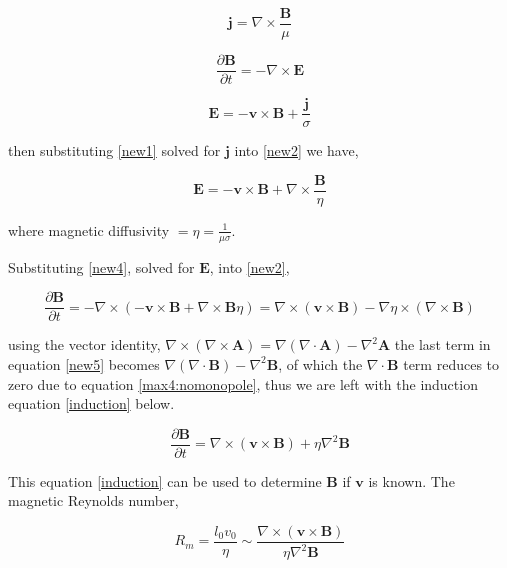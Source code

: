 \documentclass[11pt]{article}
\renewcommand{\vec}[1]{\mathbf{#1}}
\begin{document}
\begin{equation}\label{new1}
\vec{j}=\nabla\times\frac{\vec{B}}{\mu}
\end{equation}

\begin{equation}\label{new2}
\frac{\partial \vec{B}}{\partial t} = - \nabla\times\vec{E}
\end{equation}

\begin{equation}\label{new3}
\vec{E}=-\vec{v}\times\vec{B}+\frac{\vec{j}}{\sigma}
\end{equation}

then substituting \ref{new1} solved for $\vec{j}$ into \ref{new2} we have,

\begin{equation}\label{new4} 
\vec{E}=-\vec{v}\times\vec{B}+\nabla\times\frac{\vec{B}}{\eta} 
\end{equation}

where magnetic diffusivity $=\eta =\frac{1}{\mu\sigma}$.

Substituting \ref{new4}, solved for $\vec{E}$, into \ref{new2},

\begin{equation}\label{new5}
\frac{\partial \vec{B}}{\partial t}=-\nabla\times(-\vec{v}\times\vec{B} + \nabla\times\vec{B}\eta)
                                   =\nabla\times(\vec{v}\times\vec{B})-\nabla\eta\times(\nabla\times\vec{B})
\end{equation}

using the vector identity, $\nabla\times(\nabla\times\vec{A})=\nabla(\nabla\cdot\vec{A})-\nabla^{2}\vec{A}$ the last term in equation \ref{new5} becomes $\nabla(\nabla\cdot\vec{B})-\nabla^{2}\vec{B}$, of which the $\nabla\cdot\vec{B}$ term reduces to zero due to equation \ref{max4:nomonopole}, thus we are left with the induction equation \ref{induction} below. 



\begin{equation}\label{induction}
\frac{\partial \vec{B}}{\partial t}=\nabla\times(\vec{v}\times\vec{B})+\eta\nabla^{2}\vec{B}  
\end{equation}

This equation \ref{induction} can be used to determine $\vec{B}$ if $\vec{v}$ is known. The magnetic Reynolds number,

\begin{equation}\label{reynolds}
R_{m} = \frac{l_{0}v_{0}}{\eta} \sim \frac{\nabla\times(\vec{v}\times\vec{B})}{\eta\nabla^{2}\vec{B}}
\end{equation}
\end{document}

